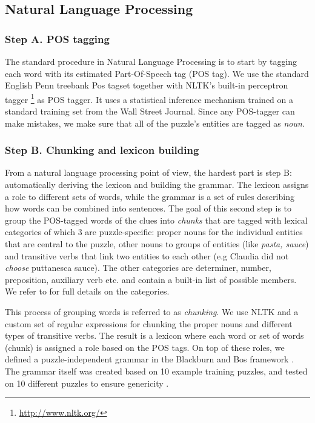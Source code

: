 \subsection{Natural Language Processing}\label{sec:pipeline:nlp}

\subsubsection*{Step A. POS tagging} The standard procedure in Natural Language Processing is to start by tagging each word with its estimated Part-Of-Speech tag (POS tag).
We use the standard English Penn treebank Pos tagset \cite{marcus1993building} together with NLTK's built-in perceptron tagger \footnote{\url{http://www.nltk.org/}} as POS tagger. 
It uses a statistical inference mechanism trained on a standard training set from the Wall Street Journal. 
Since any POS-tagger can make mistakes, we make sure that all of the puzzle's entities are tagged as \textit{noun}.

\subsubsection*{Step B. Chunking and lexicon building} From a natural language processing point of view, the hardest part is step B: automatically deriving the lexicon and building the grammar.
The lexicon assigns a role to different sets of words, while the grammar is a set of rules describing how words can be combined into sentences. 
The goal of this second step is to group the POS-tagged words of the clues into \textit{chunks} that are tagged with lexical categories of which 3 are puzzle-specific: proper nouns for the individual entities that are central to the puzzle, other nouns to groups of entities (like \textit{pasta, sauce}) and transitive verbs that link two entities to each other (e.g Claudia did not \textit{choose} puttanesca sauce). 
The other categories are determiner, number, preposition, auxiliary verb etc.  and contain a built-in list of possible members.  We refer to \cite{msc/Claes17} for full details on the categories.

This process of grouping words is referred to as \textit{chunking}. 
We use NLTK and a custom set of regular expressions for chunking the proper nouns and different types of transitive verbs.
The result is a lexicon where each word or set of words (chunk) is assigned a role based on the POS tags.  
On top of these roles, we defined a puzzle-independent grammar in the Blackburn and Bos framework \cite{Blackburn2005,Blackburn2006}.
The grammar itself was created based on 10 example training puzzles, and tested on 10 different puzzles to ensure genericity \cite{msc/Claes17}. 

